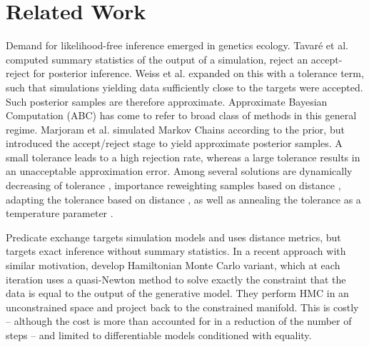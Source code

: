 \section{Related Work}

Demand for likelihood-free inference emerged in genetics ecology.
Tavar{\'e} et al.  computed summary statistics of the output of a simulation, reject an accept-reject for posterior inference.
Weiss et al.  expanded on this with a tolerance term, such that simulations yielding data sufficiently close to the targets were accepted.
Such posterior samples are therefore approximate.
Approximate Bayesian Computation (ABC) has come to refer to broad class of methods \cite{beaumont2002approximate,sisson2007sequential} in this general regime.
Marjoram et al.  simulated Markov Chains according to the prior, but introduced the accept/reject stage to yield approximate posterior samples.
A small tolerance leads to a high rejection rate, whereas a large tolerance results in an unacceptable approximation error.
Among several solutions are dynamically decreasing of tolerance \cite{toni2008approximate}, importance reweighting samples based on distance \cite{wegmann2009efficient}, adapting the tolerance based on distance \cite{del2012adaptive,lenormand2013adaptive}, as well as annealing the tolerance as a temperature parameter \cite{albert2015simulated}.

Predicate exchange targets simulation models and uses distance metrics, but targets exact inference without summary statistics.
In a recent approach with similar motivation, \cite{graham2017asymptotically} develop Hamiltonian Monte Carlo variant, which at each iteration uses a quasi-Newton method to solve exactly the constraint that the data is equal to the output of the generative model.  They perform HMC in an unconstrained space and project back to the constrained manifold.
This is costly -- although the cost is more than accounted for in a reduction of the number of steps -- and limited to differentiable models conditioned with equality. 


